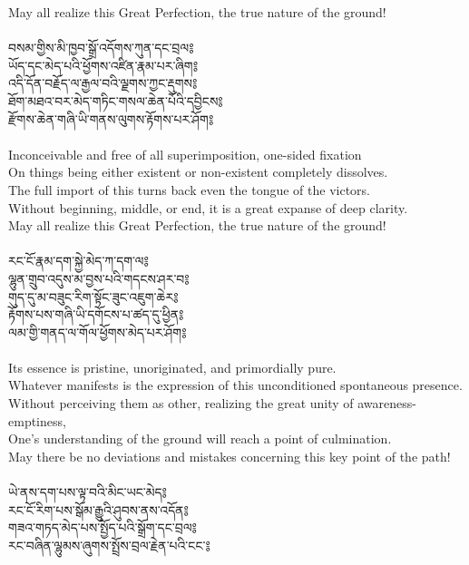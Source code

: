 May all realize this Great Perfection, the true nature of the ground!\\
\\
\ti བསམ་གྱིས་མི་ཁྱབ་སྒྲོ་འདོགས་ཀུན་དང་བྲལ༔\\
ཡོད་དང་མེད་པའི་ཕྱོགས་འཛིན་རྣམ་པར་ཞིག༔\\
འདི་དོན་བརྗོད་ལ་རྒྱལ་བའི་ལྗགས་ཀྱང་རྡུགས༔\\
ཐོག་མཐའ་བར་མེད་གཏིང་གསལ་ཆེན་པོའི་དབྱིངས༔\\
རྫོགས་ཆེན་གཞི་ཡི་གནས་ལུགས་རྟོགས་པར་ཤོག༔\\
\\
\ru Inconceivable and free of all superimposition, one-sided fixation\\
On things being either existent or non-existent completely dissolves.\\
The full import of this turns back even the tongue of the victors.\\
Without beginning, middle, or end, it is a great expanse of deep clarity.\\
May all realize this Great Perfection, the true nature of the ground!\\
\\
\newpage
\ti རང་ངོ་རྣམ་དག་སྐྱེ་མེད་ཀ་དག་ལ༔\\
ལྷུན་གྲུབ་འདུས་མ་བྱས་པའི་གདངས་ཤར་བ༔\\
གུད་དུ་མ་བཟུང་རིག་སྟོང་ཟུང་འཇུག་ཆེར༔\\
རྟོགས་པས་གཞི་ཡི་དགོངས་པ་ཚད་དུ་ཕྱིན༔\\
ལམ་གྱི་གནད་ལ་གོལ་ཕྱོགས་མེད་པར་ཤོག༔\\
\\
\ru Its essence is pristine, unoriginated, and primordially pure.\\
Whatever manifests is the expression of this unconditioned spontaneous presence.\\
Without perceiving them as other, realizing the great unity of awareness-emptiness,\\
One’s understanding of the ground will reach a point of culmination.\\
May there be no deviations and mistakes concerning this key point of the path!\\
\\
\ti ཡེ་ནས་དག་པས་ལྟ་བའི་མིང་ཡང་མེད༔\\
རང་ངོ་རིག་པས་སྒོམ་རྒྱུའི་ཤུབས་ནས་འདོན༔\\
གཟའ་གཏད་མེད་པས་སྤྱོད་པའི་སྒྲོག་དང་བྲལ༔\\
རང་བཞིན་ལྷུམས་ཞུགས་སྤྲོས་བྲལ་རྗེན་པའི་ངང༌༔\\
